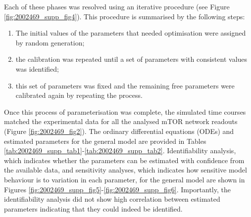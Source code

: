 Each of these phases was resolved using an iterative procedure (see Figure \ref{fig:2002469_supp_fig4}). This procedure is summarised by the following steps: 
\begin{enumerate}
 \item The initial values of the parameters that needed optimisation were assigned by random generation;
 \item the calibration was repeated until a set of parameters with consistent values was identified;
 \item this set of parameters was fixed and the remaining free parameters were calibrated again by repeating the process. 
\end{enumerate}
Once this process of parameterisation was complete, the simulated time courses matched the experimental data for all the analysed mTOR network readouts (Figure \ref{fig:2002469_fig2}). The ordinary differential equations (ODEs) and estimated parameters for the general model are provided in Tables \ref{tab:2002469_supp_tab1}-\ref{tab:2002469_supp_tab2}. Identifiability analysis, which indicates whether the parameters can be estimated with confidence from the available data, and sensitivity analyses, which indicates how sensitive model behaviour is to variation in each parameter, for the general model are shown in Figures \ref{fig:2002469_supp_fig5}-\ref{fig:2002469_supp_fig6}. Importantly, the identifiability analysis did not show high correlation between estimated parameters indicating that they could indeed be identified.

